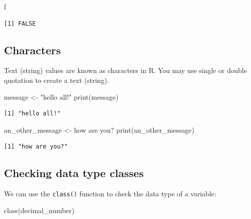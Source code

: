 \documentclass[
  letterpaper,
  DIV=11,
  numbers=noendperiod]{scrreprt}
\newenvironment{Shaded}{\begin{snugshade}}{\end{snugshade}}
\newcommand{\FunctionTok}[1]{\textcolor[rgb]{0.28,0.35,0.67}{#1}}
\newcommand{\NormalTok}[1]{\textcolor[rgb]{0.00,0.23,0.31}{#1}}
\newcommand{\OtherTok}[1]{\textcolor[rgb]{0.00,0.23,0.31}{#1}}
\newcommand{\StringTok}[1]{\textcolor[rgb]{0.13,0.47,0.30}{#1}}
\begin{document}
\begin{Shaded}
\begin{Highlighting}[]
\NormalTok{f}
\end{Highlighting}
\end{Shaded}

\begin{verbatim}
[1] FALSE
\end{verbatim}

\subsection{Characters}\label{characters}

Text (string) values are known as characters in R. You may use single or
double quotation to create a text (string).

\begin{Shaded}
\begin{Highlighting}[]
\NormalTok{message }\OtherTok{\textless{}{-}} \StringTok{"hello all!"}
\FunctionTok{print}\NormalTok{(message)}
\end{Highlighting}
\end{Shaded}

\begin{verbatim}
[1] "hello all!"
\end{verbatim}

\begin{Shaded}
\begin{Highlighting}[]
\NormalTok{an\_other\_message }\OtherTok{\textless{}{-}} \StringTok{\textquotesingle{}how are you?\textquotesingle{}}
\FunctionTok{print}\NormalTok{(an\_other\_message)}
\end{Highlighting}
\end{Shaded}

\begin{verbatim}
[1] "how are you?"
\end{verbatim}

\subsection{Checking data type
classes}\label{checking-data-type-classes}

We can use the \texttt{class()} function to check the data type of a
variable:

\begin{Shaded}
\begin{Highlighting}[]
\FunctionTok{class}\NormalTok{(decimal\_number)}
\end{Highlighting}
\end{Shaded}
\end{document}
